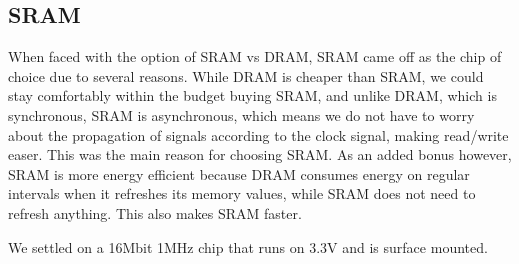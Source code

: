 
\subsection{SRAM}

When faced with the option of SRAM vs DRAM, SRAM came off as the chip of choice
due to several reasons. While DRAM is cheaper than SRAM, we could stay
comfortably within the budget buying SRAM,
and unlike DRAM, which is synchronous, SRAM is asynchronous, which means we do
not have to worry about the propagation of signals according to the clock
signal, making read/write easer. This was the main reason for choosing SRAM. As
an added bonus however, SRAM is more energy efficient because DRAM consumes
energy on regular intervals when it refreshes its memory values, while SRAM does
not need to refresh anything. This also makes SRAM faster.

We settled on a 16Mbit 1MHz chip that runs on 3.3V and is surface mounted.